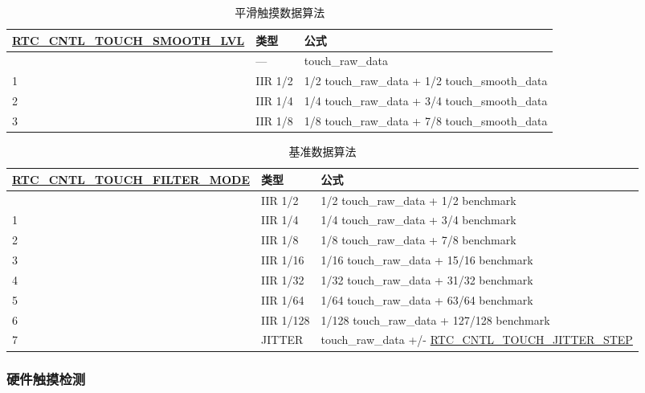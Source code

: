 \documentclass[main\_\_CN.tex]{subfiles}
\begin{document}
\begin{longtable}[c]{|p{6 cm}|p{1.5cm}|p{7cm}|}
    \caption{平滑触摸数据算法}
    \label{tab:smooth-cal}\\
    \hline
    \rowcolor{lightgray}
    \textbf{\hyperref[fielddesc:RTCCNTLTOUCHSMOOTHLVL]{RTC\_CNTL\_TOUCH\_SMOOTH\_LVL}} & \textbf{类型} & \textbf{公式}\\
    \hline
    \endhead
    \endfoot
    \endlastfoot
    0  & --- & touch\_raw\_data  \\\hline
    1  & IIR 1/2 & 1/2 touch\_raw\_data + 1/2 touch\_smooth\_data \\\hline
    2  & IIR 1/4 & 1/4 touch\_raw\_data + 3/4 touch\_smooth\_data \\\hline
    3  & IIR 1/8 & 1/8 touch\_raw\_data + 7/8 touch\_smooth\_data \\\hline
\end{longtable}

\begin{longtable}[c]{|p{5.5 cm}|p{1.5cm}|p{8.5cm}|}
    \caption{基准数据算法}
    \label{tab:base-line-cal}\\
    \hline
    \rowcolor{lightgray}
    \textbf{\hyperref[fielddesc:RTCCNTLTOUCHFILTERMODE]{RTC\_CNTL\_TOUCH\_FILTER\_MODE}} & \textbf{类型} & \textbf{公式}\\
    \hline
    \endhead
    \endfoot
    \endlastfoot
    0  &  IIR 1/2 & 1/2 touch\_raw\_data + 1/2 benchmark \\\hline
    1  &  IIR 1/4 & 1/4 touch\_raw\_data + 3/4 benchmark \\\hline
    2  &  IIR 1/8 & 1/8 touch\_raw\_data + 7/8 benchmark \\\hline
    3  &  IIR 1/16 & 1/16 touch\_raw\_data + 15/16 benchmark \\\hline
    4  &  IIR 1/32 & 1/32 touch\_raw\_data + 31/32 benchmark \\\hline
    5  &  IIR 1/64 & 1/64 touch\_raw\_data + 63/64 benchmark \\\hline
    6  &  IIR 1/128 & 1/128 touch\_raw\_data + 127/128 benchmark \\\hline
    7  &  JITTER & touch\_raw\_data +/- \hyperref[fielddesc:RTCCNTLTOUCHJITTERSTEP]{RTC\_CNTL\_TOUCH\_JITTER\_STEP} \\\hline
\end{longtable}

\subsubsection{硬件触摸检测}
\end{document}

